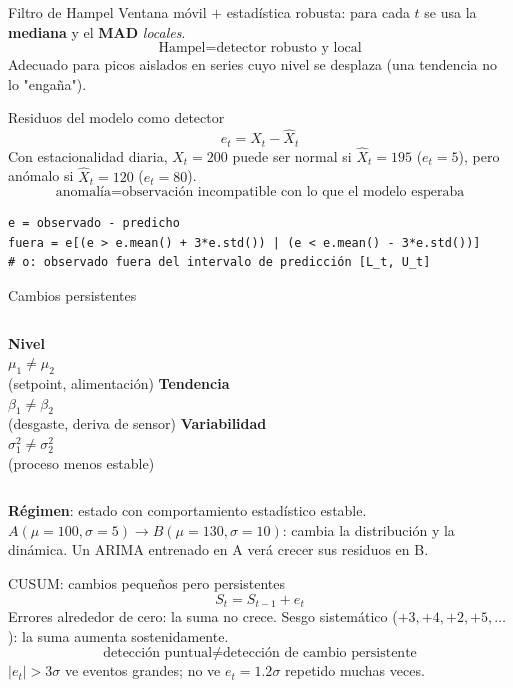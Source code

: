 \begin{frame}{Filtro de Hampel}
Ventana móvil $+$ estadística robusta: para cada $t$ se usa la \textbf{mediana} y el
\textbf{MAD} \emph{locales}.
\[
\boxed{\text{Hampel} = \text{detector robusto y local}}
\]
Adecuado para picos aislados en series cuyo nivel se desplaza (una tendencia no lo
"engaña").
\end{frame}

\begin{frame}[fragile]{Residuos del modelo como detector}
\[
e_t=X_t-\hat X_t
\]
Con estacionalidad diaria, $X_t=200$ puede ser normal si $\hat X_t=195$ ($e_t=5$),
pero anómalo si $\hat X_t=120$ ($e_t=80$).
\[
\boxed{\text{anomalía} = \text{observación incompatible con lo que el modelo esperaba}}
\]
\begin{lstlisting}
e = observado - predicho
fuera = e[(e > e.mean() + 3*e.std()) | (e < e.mean() - 3*e.std())]
# o: observado fuera del intervalo de predicción [L_t, U_t]
\end{lstlisting}
\end{frame}

\begin{frame}{Cambios persistentes}
\begin{columns}[T]
\textbf{Nivel}\\ $\mu_1\neq\mu_2$\\ (setpoint, alimentación)
\textbf{Tendencia}\\ $\beta_1\neq\beta_2$\\ (desgaste, deriva de sensor)
\textbf{Variabilidad}\\ $\sigma_1^2\neq\sigma_2^2$\\ (proceso menos estable)
\end{columns}
\vfill
\textbf{Régimen}: estado con comportamiento estadístico estable.
$A(\mu=100,\sigma=5)\to B(\mu=130,\sigma=10)$: cambia la distribución y la dinámica.
Un ARIMA entrenado en A verá crecer sus residuos en B.
\end{frame}

\begin{frame}{CUSUM: cambios pequeños pero persistentes}
\[
S_t=S_{t-1}+e_t
\]
Errores alrededor de cero: la suma no crece. Sesgo sistemático
($+3,+4,+2,+5,\dots$): la suma aumenta sostenidamente.
\[
\boxed{\text{detección puntual}\neq\text{detección de cambio persistente}}
\]
$|e_t|>3\sigma$ ve eventos grandes; no ve $e_t=1.2\sigma$ repetido muchas veces.
\end{frame}

